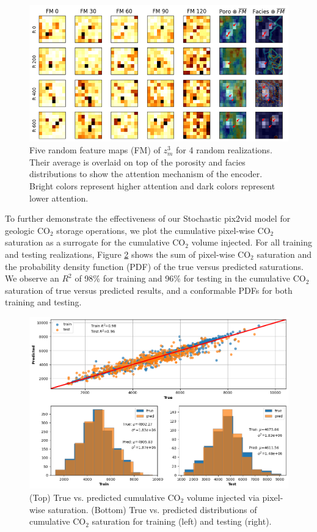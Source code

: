 \documentclass[10pt, twoside]{article}
\begin{document}
\begin{figure}
    \centering
    \includegraphics[width=16cm]{figures/feature_maps.png}
    \caption{Five random feature maps (FM) of $z_m^3$ for 4 random realizations. Their average is overlaid on top of the porosity and facies distributions to show the attention mechanism of the encoder. Bright colors represent higher attention and dark colors represent lower attention.}
    \label{feature_maps}
\end{figure}

To further demonstrate the effectiveness of our Stochastic pix2vid model for geologic CO$_2$ storage operations, we plot the cumulative pixel-wise CO$_2$ saturation as a surrogate for the cumulative CO$_2$ volume injected. For all training and testing realizations, Figure \ref{co2_pvi} shows the sum of pixel-wise CO$_2$ saturation and the probability density function (PDF) of the true versus predicted saturations. We observe an $R^2$ of 98\% for training and 96\% for testing in the cumulative CO$_2$ saturation of true versus predicted results, and a conformable PDFs for both training and testing.

\begin{figure}
    \centering
    \includegraphics[width=16cm]{figures/co2_pvi.png}
    \caption{(Top) True vs. predicted cumulative CO$_2$ volume injected via pixel-wise saturation. (Bottom) True vs. predicted distributions of cumulative CO$_2$ saturation for training (left) and testing (right).}
    \label{co2_pvi}
\end{figure}
\end{document}

